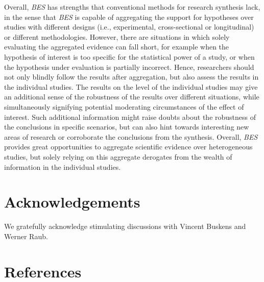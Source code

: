 \documentclass[
]{interact}
\begin{document}
Overall, \emph{BES} has strengths that conventional methods for research
synthesis lack, in the sense that \emph{BES} is capable of aggregating
the support for hypotheses over studies with different designs (i.e.,
experimental, cross-sectional or longitudinal) or different
methodologies. However, there are situations in which solely evaluating
the aggregated evidence can fall short, for example when the hypothesis
of interest is too specific for the statistical power of a study, or
when the hypothesis under evaluation is partially incorrect. Hence,
researchers should not only blindly follow the results after
aggregation, but also assess the results in the individual studies. The
results on the level of the individual studies may give an additional
sense of the robustness of the results over different situations, while
simultaneously signifying potential moderating circumstances of the
effect of interest. Such additional information might raise doubts about
the robustness of the conclusions in specific scenarios, but can also
hint towards interesting new areas of research or corroborate the
conclusions from the synthesis. Overall, \emph{BES} provides great
opportunities to aggregate scientific evidence over heterogeneous
studies, but solely relying on this aggregate derogates from the wealth
of information in the individual studies.

\hypertarget{acknowledgements}{%
\section{Acknowledgements}\label{acknowledgements}}

We gratefully acknowledge stimulating discussions with Vincent Buskens
and Werner Raub.

\hypertarget{references}{%
\section{References}\label{references}}

\small
\end{document}
